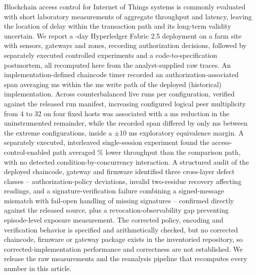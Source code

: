 Blockchain access control for Internet of Things systems is commonly evaluated with short laboratory measurements of aggregate throughput and latency, leaving the location of delay within the transaction path and its long-term validity uncertain. We report a \DeploymentDays{}-day Hyperledger Fabric 2.5 deployment on a farm site with \Sensors{} sensors, \Gateways{} gateways and \Zones{} zones, recording \AuthDecisions{} authorization decisions, followed by separately executed controlled experiments and a code-to-specification postmortem, all recomputed here from the analyst-supplied raw traces. An implementation-defined chaincode timer recorded an authorization-associated span averaging \SpanLatencyPeerFour{} ms within the \TotalLatencyPeerFour{} ms write path of the deployed (historical) implementation. Across \PeerRunsPerConfig{} counterbalanced live runs per configuration, verified against the released run manifest, increasing configured logical peer multiplicity from 4 to 32 on four fixed hosts was associated with a \RemainingLatencyDiffFourVThirtyTwo{} ms reduction in the uninstrumented remainder, while the recorded span differed by only \SpanDiffFourVThirtyTwo{} ms between the extreme configurations, inside a $\pm$10 ms exploratory equivalence margin. A separately executed, interleaved single-session experiment found the access-control-enabled path averaged \ThroughputPctDiffMean{}\% lower throughput than the comparison path, with no detected condition-by-concurrency interaction. A structured audit of the deployed chaincode, gateway and firmware identified three cross-layer defect classes -- authorization-policy deviations, invalid two-residue recovery affecting \CrtTwoResidueCount{} readings, and a signature-verification failure combining a signed-message mismatch with fail-open handling of missing signatures -- confirmed directly against the released source, plus a revocation-observability gap preventing episode-level exposure measurement. The corrected policy, encoding and verification behavior is specified and arithmetically checked, but no corrected chaincode, firmware or gateway package exists in the inventoried repository, so corrected-implementation performance and correctness are not established. We release the raw measurements and the reanalysis pipeline that recomputes every number in this article.
